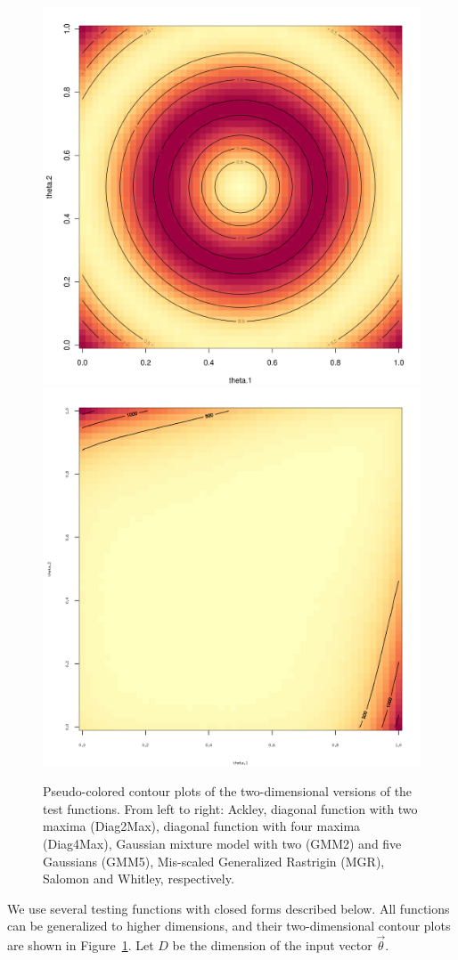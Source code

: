 \begin{figure}[htbp]
\begin{center}
\includegraphics[width=0.24\linewidth]{figs/chap5/Salomon.png}
\includegraphics[width=0.24\linewidth]{figs/chap5/Whitley.png}
\caption{Pseudo-colored contour plots of the two-dimensional versions of the test functions.
%
From left to right: Ackley, diagonal function with two maxima (Diag2Max), diagonal function with four maxima (Diag4Max), Gaussian mixture model with two (GMM2) and five Gaussians (GMM5), Mis-scaled Generalized Rastrigin (MGR), Salomon and Whitley, respectively.}
\label{fig:original}
\end{center}
\end{figure}

We use several testing functions with closed forms described below.
%
All functions can be generalized to higher dimensions, and their two-dimensional contour plots are shown in Figure~\ref{fig:original}.
%
Let $D$ be the dimension of the input vector $\vec{\theta}$.


